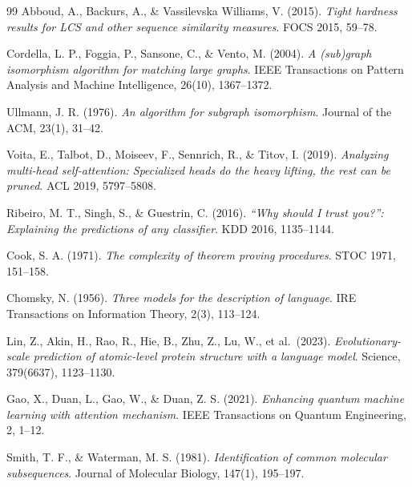 ﻿\documentclass[a4paper,12pt]{article}
\theoremstyle{definition}
\begin{document}
\begin{thebibliography}{99}
Abboud, A., Backurs, A., \& Vassilevska Williams, V. (2015).
\textit{Tight hardness results for LCS and other sequence similarity measures}.
FOCS 2015, 59--78.

Cordella, L. P., Foggia, P., Sansone, C., \& Vento, M. (2004).
\textit{A (sub)graph isomorphism algorithm for matching large graphs}.
IEEE Transactions on Pattern Analysis and Machine Intelligence, 26(10), 1367--1372.

Ullmann, J. R. (1976).
\textit{An algorithm for subgraph isomorphism}.
Journal of the ACM, 23(1), 31--42.

Voita, E., Talbot, D., Moiseev, F., Sennrich, R., \& Titov, I. (2019).
\textit{Analyzing multi-head self-attention: Specialized heads do the heavy
lifting, the rest can be pruned}.
ACL 2019, 5797--5808.

Ribeiro, M. T., Singh, S., \& Guestrin, C. (2016).
\textit{``Why should I trust you?'': Explaining the predictions of any
classifier}.
KDD 2016, 1135--1144.

Cook, S. A. (1971).
\textit{The complexity of theorem proving procedures}.
STOC 1971, 151--158.

Chomsky, N. (1956).
\textit{Three models for the description of language}.
IRE Transactions on Information Theory, 2(3), 113--124.

Lin, Z., Akin, H., Rao, R., Hie, B., Zhu, Z., Lu, W., et al.\ (2023).
\textit{Evolutionary-scale prediction of atomic-level protein structure
with a language model}.
Science, 379(6637), 1123--1130.

Gao, X., Duan, L., Gao, W., \& Duan, Z. S. (2021).
\textit{Enhancing quantum machine learning with attention mechanism}.
IEEE Transactions on Quantum Engineering, 2, 1--12.

Smith, T. F., \& Waterman, M. S. (1981).
\textit{Identification of common molecular subsequences}.
Journal of Molecular Biology, 147(1), 195--197.

\end{thebibliography}
\end{document}
